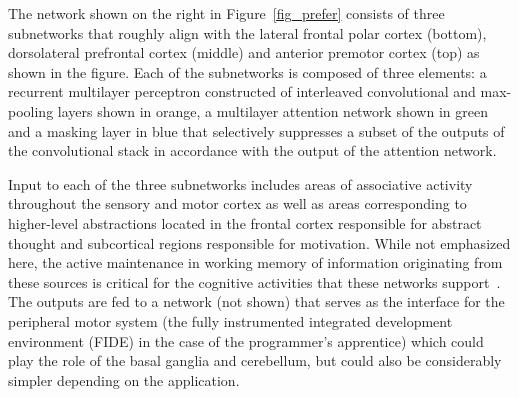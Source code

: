 \documentclass[letterpaper,11pt]{article}
\def\footnote#1{{}}
\def\urlh#1{{}}
\begin{document}

The network shown on the right in Figure~{\urlh{#fig_Prefrontal_Hierarchy_Biology_Technology}{\ref{fig_prefer}}} consists of three subnetworks that roughly align with the {\urlh{https://en.wikipedia.org/wiki/Frontal_lobe}{lateral frontal polar cortex}} (bottom), {\urlh{https://en.wikipedia.org/wiki/Dorsolateral_prefrontal_cortex}{dorsolateral prefrontal cortex}} (middle) and {\urlh{https://en.wikipedia.org/wiki/Premotor_cortex}{anterior premotor cortex}} (top) as shown in the figure. Each of the subnetworks is composed of three elements: a recurrent multilayer perceptron constructed of interleaved convolutional and max-pooling layers shown in orange, a multilayer attention network shown in green and a masking layer in blue that selectively suppresses a subset of the outputs of the convolutional stack in accordance with the output of the attention network.

Input to each of the three subnetworks includes areas of associative activity throughout the sensory and motor cortex as well as areas corresponding to higher-level abstractions located in the frontal cortex responsible for abstract thought and subcortical regions responsible for motivation. While not emphasized here, the active maintenance in working memory of information originating from these sources\footnote{%
  Susan Courtney provides an excellent overview of the many sources of information that are utilized by cognitive functions supported in the frontal cortex~\cite{CourtneyCABN-04}. In particular, her articulation of the role of attention and cognitive control aligns with the views that we've emphasized in class and that drive our designs:
\begin{quotation}
  [The circuits in the prefrontal cortex that drive goal directed planning and executive control] receive multimodal information about the current environment and have access to previously stored memories. The prefrontal cortex's extensive outputs allow for direct control of motor behavior, but they may also influence behavior indirectly by altering perceptual and cognitive representations and influencing the storage and re- trieval of long-term memories.\\
  I suggest that attention and cognitive control are not directed actions or specific processes contained within any particular set of brain regions. Rather, what we experience and observe that we call attention and cognitive control are emergent properties dependent on the dis- tributed representation of all types of information, both that available from present perceptual input and the information currently sustained in WM, including contextual and motivational information.
%
\end{quotation}}
%
is critical for the cognitive activities that these networks support~\cite{CourtneyCABN-04,Goldman-RakicARN-88}. The outputs are fed to a network (not shown) that serves as the interface for the peripheral motor system (the fully instrumented integrated development environment (FIDE) in the case of the programmer's apprentice) which could play the role of the basal ganglia and cerebellum, but could also be considerably simpler depending on the application.
\end{document}
